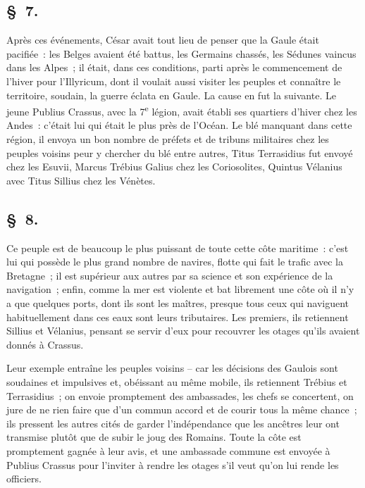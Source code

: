 \documentclass[french,twoside]{book} %
\begin{document}
\subsection[{§ 7.}]{ \textsc{§ 7.} }
\noindent Après ces événements, César avait tout lieu de penser que la Gaule était pacifiée : les Belges avaient été battus, les Germains chassés, les Sédunes vaincus dans les Alpes ; il était, dans ces conditions, parti après le commencement de l’hiver pour l’Illyricum, dont il voulait aussi visiter les peuples et connaître le territoire, soudain, la guerre éclata en Gaule. La cause en fut la suivante. Le jeune Publius Crassus, avec la 7\textsuperscript{e} légion, avait établi ses quartiers d’hiver chez les Andes : c’était lui qui était le plus près de l’Océan. Le blé manquant dans cette région, il envoya un bon nombre de préfets et de tribuns militaires chez les peuples voisins peur y chercher du blé entre autres, Titus Terrasidius fut envoyé chez les Esuvii, Marcus Trébius Galius chez les Coriosolites, Quintus Vélanius avec Titus Sillius chez les Vénètes.
\subsection[{§ 8.}]{ \textsc{§ 8.} }
\noindent Ce peuple est de beaucoup le plus puissant de toute cette côte maritime : c’est lui qui possède le plus grand nombre de navires, flotte qui fait le trafic avec la Bretagne ; il est supérieur aux autres par sa science et son expérience de la navigation ; enfin, comme la mer est violente et bat librement une côte où il n’y a que quelques ports, dont ils sont les maîtres, presque tous ceux qui naviguent habituellement dans ces eaux sont leurs tributaires. Les premiers, ils retiennent Sillius et Vélanius, pensant se servir d’eux pour recouvrer les otages qu’ils avaient donnés à Crassus.\par
\par
Leur exemple entraîne les peuples voisins – car les décisions des Gaulois sont soudaines et impulsives et, obéissant au même mobile, ils retiennent Trébius et Terrasidius ; on envoie promptement des ambassades, les chefs se concertent, on jure de ne rien faire que d’un commun accord et de courir tous la même chance ; ils pressent les autres cités de garder l’indépendance que les ancêtres leur ont transmise plutôt que de subir le joug des Romains. Toute la côte est promptement gagnée à leur avis, et une ambassade commune est envoyée à Publius Crassus pour l’inviter à rendre les otages s’il veut qu’on lui rende les officiers.
\end{document}

